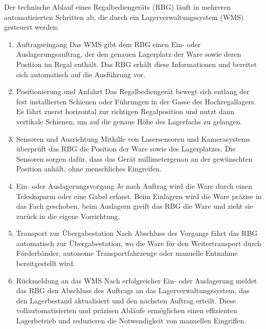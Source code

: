 Der technische Ablauf eines Regalbediengeräts (RBG) läuft in mehreren automatisierten Schritten ab, die durch ein Lagerverwaltungssystem (WMS) gesteuert werden:
\begin{enumerate}
\item Auftragseingang
Das WMS gibt dem RBG einen Ein- oder Auslagerungsauftrag, der den genauen Lagerplatz der Ware sowie deren Position im Regal enthält. Das RBG erhält diese Informationen und bereitet sich automatisch auf die Ausführung vor.
\item Positionierung und Anfahrt
Das Regalbediengerät bewegt sich entlang der fest installierten Schienen oder Führungen in der Gasse des Hochregallagers. Es fährt zuerst horizontal zur richtigen Regalposition und nutzt dann vertikale Schienen, um auf die genaue Höhe des Lagerfachs zu gelangen.
\item Sensoren und Ausrichtung
Mithilfe von Lasersensoren und Kamerasystems überprüft das RBG die Position der Ware sowie des Lagerplatzes. Die Sensoren sorgen dafür, dass das Gerät millimetergenau an der gewünschten Position anhält, ohne menschliches Eingreifen.
\item Ein- oder Auslagerungsvorgang
Je nach Auftrag wird die Ware durch einen Teleskoparm oder eine Gabel erfasst. Beim Einlagern wird die Ware präzise in das Fach geschoben, beim Auslagern greift das RBG die Ware und zieht sie zurück in die eigene Vorrichtung.
\item Transport zur Übergabestation
Nach Abschluss des Vorgangs fährt das RBG automatisch zur Übergabestation, wo die Ware für den Weitertransport durch Förderbänder, autonome Transportfahrzeuge oder manuelle Entnahme bereitgestellt wird.
\item Rückmeldung an das WMS
Nach erfolgreicher Ein- oder Auslagerung meldet das RBG den Abschluss des Auftrags an das Lagerverwaltungssystem, das den Lagerbestand aktualisiert und den nächsten Auftrag erteilt.
Diese vollautomatisierten und präzisen Abläufe ermöglichen einen effizienten Lagerbetrieb und reduzieren die Notwendigkeit von manuellen Eingriffen.
\end{enumerate}

